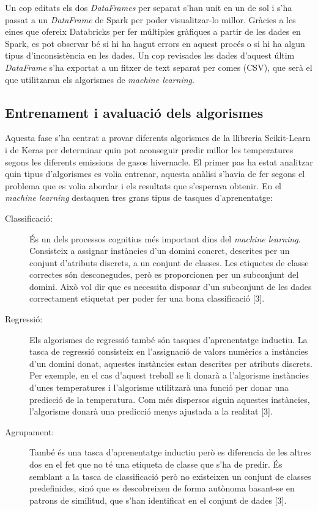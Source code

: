 \documentclass[10pt,a4paper,twocolumn,twoside]{article}
\begin{document}
Un cop editats els dos \textit{DataFrames} per separat s'han unit en un de sol i s'ha passat a un \textit{DataFrame} de Spark per poder visualitzar-lo millor. Gràcies a les eines que ofereix Databricks per fer múltiples gràfiques a partir de les dades en Spark, es pot observar bé si hi ha hagut errors en aquest procés o si hi ha algun tipus d'inconsistència en les dades. Un cop revisades les dades d'aquest últim \textit{DataFrame} s'ha exportat a un fitxer de text separat per comes (CSV), que serà el que utilitzaran els algorismes de \textit{machine learning}.

\subsection{Entrenament i avaluació dels algorismes}
Aquesta fase s'ha centrat a provar diferents algorismes de la llibreria Scikit-Learn i de Keras per determinar quin pot aconseguir predir millor les temperatures segons les diferents emissions de gasos hivernacle. El primer pas ha estat analitzar quin tipus d'algorismes es volia entrenar, aquesta anàlisi s'havia de fer segons el problema que es volia abordar i els resultats que s'esperava obtenir. En el \textit{machine learning} destaquen tres grans tipus de tasques d'aprenentatge:

\begin{description}
\item[Classificació:] És un dels processos cognitius més important dins del \textit{machine learning}. Consisteix a assignar instàncies d'un domini concret, descrites per un conjunt d'atributs discrets, a un conjunt de classes. Les etiquetes de classe correctes són desconegudes, però es proporcionen per un subconjunt del domini. Això vol dir que es necessita disposar d'un subconjunt de les dades correctament etiquetat per poder fer una bona classificació [3].
\item[Regressió:] Els algorismes de regressió també són tasques d'aprenentatge inductiu. La tasca de regressió consisteix en l'assignació de valors numèrics a instàncies d'un domini donat, aquestes instàncies estan descrites per atributs discrets. Per exemple, en el cas d'aquest treball se li donarà a l'algorisme instàncies d'unes temperatures i l'algorisme utilitzarà una funció per donar una predicció de la temperatura. Com més dispersos siguin aquestes instàncies, l'algorisme donarà una predicció menys ajustada a la realitat [3].
\item[Agrupament:] També és una tasca d'aprenentatge inductiu però es diferencia de les altres dos en el fet que no té una etiqueta de classe que s'ha de predir. És semblant a la tasca de classificació però no existeixen un conjunt de classes predefinides, sinó que es descobreixen de forma autònoma basant-se en patrons de similitud, que s'han identificat en el conjunt de dades [3].
\end{description}
\end{document}
